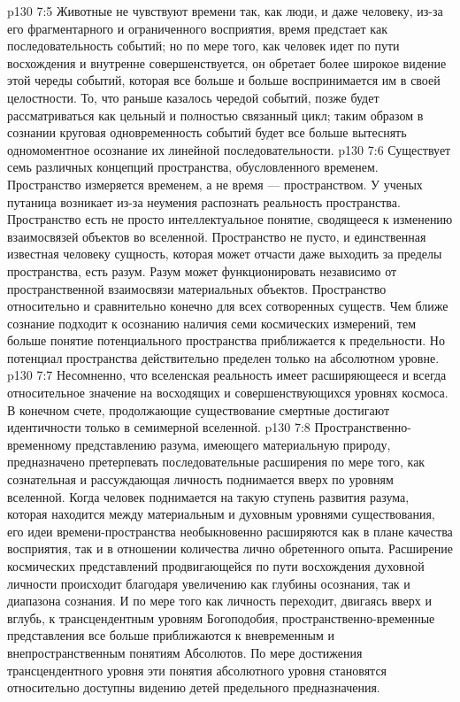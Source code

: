 \vs p130 7:5 Животные не чувствуют времени так, как люди, и даже человеку, из\hyp{}за его фрагментарного и ограниченного восприятия, время предстает как последовательность событий; но по мере того, как человек идет по пути восхождения и внутренне совершенствуется, он обретает более широкое видение этой череды событий, которая все больше и больше воспринимается им в своей целостности. То, что раньше казалось чередой событий, позже будет рассматриваться как цельный и полностью связанный цикл; таким образом в сознании круговая одновременность событий будет все больше вытеснять одномоментное осознание их линейной последовательности.
\vs p130 7:6 Существует семь различных концепций пространства, обусловленного временем. Пространство измеряется временем, а не время --- пространством. У ученых путаница возникает из\hyp{}за неумения распознать реальность пространства. Пространство есть не просто интеллектуальное понятие, сводящееся к изменению взаимосвязей объектов во вселенной. Пространство не пусто, и единственная известная человеку сущность, которая может отчасти даже выходить за пределы пространства, есть разум. Разум может функционировать независимо от пространственной взаимосвязи материальных объектов. Пространство относительно и сравнительно конечно для всех сотворенных существ. Чем ближе сознание подходит к осознанию наличия семи космических измерений, тем больше понятие потенциального пространства приближается к предельности. Но потенциал пространства действительно пределен только на абсолютном уровне.
\vs p130 7:7 Несомненно, что вселенская реальность имеет расширяющееся и всегда относительное значение на восходящих и совершенствующихся уровнях космоса. В конечном счете, продолжающие существование смертные достигают идентичности только в семимерной вселенной.
\vs p130 7:8 \pc Пространственно\hyp{}временному представлению разума, имеющего материальную природу, предназначено претерпевать последовательные расширения по мере того, как сознательная и рассуждающая личность поднимается вверх по уровням вселенной. Когда человек поднимается на такую ступень развития разума, которая находится между материальным и духовным уровнями существования, его идеи времени\hyp{}пространства необыкновенно расширяются как в плане качества восприятия, так и в отношении количества лично обретенного опыта. Расширение космических представлений продвигающейся по пути восхождения духовной личности происходит благодаря увеличению как глубины осознания, так и диапазона сознания. И по мере того как личность переходит, двигаясь вверх и вглубь, к трансцендентным уровням Богоподобия, пространственно\hyp{}временные представления все больше приближаются к вневременным и внепространственным понятиям Абсолютов. По мере достижения трансцендентного уровня эти понятия абсолютного уровня становятся относительно доступны видению детей предельного предназначения.
